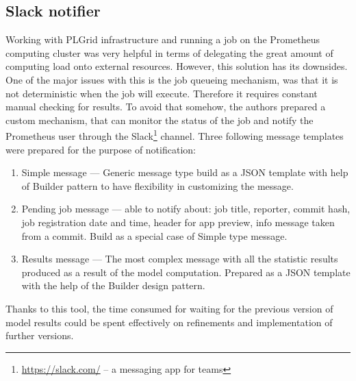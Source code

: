 \subsection{Slack notifier}\label{subsec:slack-notifier}
Working with PLGrid infrastructure and running a job on the Prometheus computing cluster was very helpful in terms of delegating the great amount of computing load onto external resources.
However, this solution has its downsides.
One of the major issues with this is the job queueing mechanism, was that it is not deterministic when the job will execute.
Therefore it requires constant manual checking for results.
To avoid that somehow, the authors prepared a custom mechanism, that can monitor the status of the job and notify the Prometheus user through the Slack\footnote{\url{https://slack.com/} – a messaging app for teams} channel.
Three following message templates were prepared for the purpose of notification:
\begin{enumerate}
    \item Simple message --- Generic message type build as a JSON template with help of Builder pattern to have flexibility in customizing the message.
    \item Pending job message --- able to notify about: job title, reporter, commit hash, job registration date and time, header for app preview, info message taken from a commit.
    Build as a special case of Simple type message.
    \item Results message --- The most complex message with all the statistic results produced as a result of the model computation. Prepared as a JSON template with the help of the Builder design pattern.
\end{enumerate}

Thanks to this tool, the time consumed for waiting for the previous version of model results could be spent effectively on refinements and implementation of further versions.
